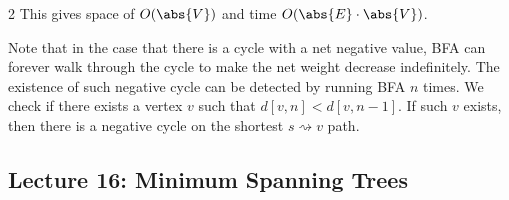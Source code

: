 \begin{multicols}{2}
This gives space of $O(\abs{V})$ and time $O(\abs{E} \cdot \abs{V})$. 

Note that in the case that there is a cycle with a net negative value, BFA can forever walk through the cycle to make the net weight decrease indefinitely. The existence of such negative cycle can be detected by running BFA $n$ times. We check if there exists a vertex $v$ such that $d[v,n] < d[v,n - 1]$. If such $v$ exists, then there is a negative cycle on the shortest $s\rightsquigarrow v$ path.
\end{multicols}

\newpage
\subsection*{Lecture 16: Minimum Spanning Trees}

